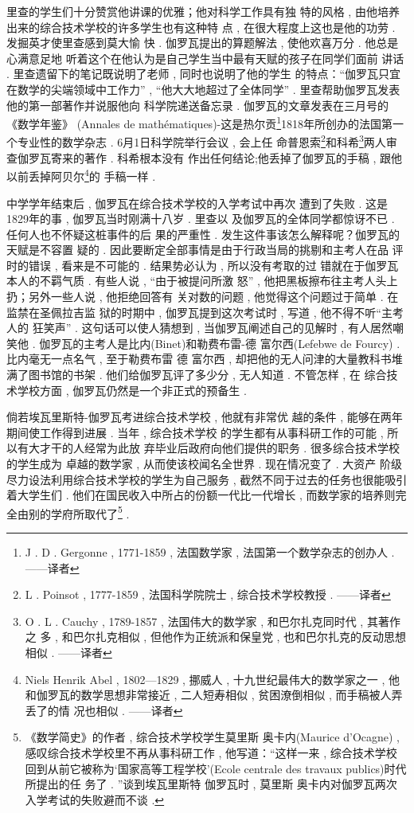 里查的学生们十分赞赏他讲课的优雅；他对科学工作具有独 特的风格 , 由他培养出来的综合技术学校的许多学生也有这种特 点 , 在很大程度上这也是他的功劳 . 发掘英才使里查感到莫大愉 快 . 伽罗瓦提出的算题解法 , 使他欢喜万分 . 他总是心满意足地 听着这个在他认为是自己学生当中最有天赋的孩子在同学们面前 讲话 . 里查遗留下的笔记既说明了老师 , 同时也说明了他的学生 的特点：“伽罗瓦只宜在数学的尖端领域中工作力” , “他大大地超过了全体同学” .  里查帮助伽罗瓦发表他的第一部著作并说服他向 科学院递送备忘录 . 伽罗瓦的文章发表在三月号的《数学年鉴》 (Annales de mathématiques)-这是热尔贡\footnote{J . D .  Gergonne ,  1771-1859 , 法国数学家 , 法国第一个数学杂志的创办人 .  ——译者}1818年所创办的法国第一个专业性的数学杂志 . 6月1日科学院举行会议 , 会上任 命普恩索\footnote{L . Poinsot , 1777-1859 , 法国科学院院士 , 综合技术学校教授 . ——译者}和科希\footnote{O . L . Cauchy , 1789-1857 , 法国伟大的数学家 , 和巴尔扎克同时代 , 其著作之 多 , 和巴尔扎克相似 , 但他作为正统派和保皇党 , 也和巴尔扎克的反动思想相似 .  ——译者}两人审查伽罗瓦寄来的著作 . 科希根本没有 作出任何结论;他丢掉了伽罗瓦的手稿 , 跟他以前丢掉阿贝尔\footnote{Niels Henrik Abel ,  1802—1829 , 挪威人 , 十九世纪最伟大的数学家之一 , 他 和伽罗瓦的数学思想非常接近 , 二人短寿相似 , 贫困潦倒相似 , 而手稿被人弄丢了的情 况也相似 . ——译者}的 手稿一样 . 

中学学年结束后 , 伽罗瓦在综合技术学校的入学考试中再次 遭到了失败 . 这是1829年的事 , 伽罗瓦当时刚满十八岁 . 里查以 及伽罗瓦的全体同学都惊讶不已 . 任何人也不怀疑这桩事件的后 果的严重性 . 发生这件事该怎么解释呢？伽罗瓦的天赋是不容置 疑的 . 因此要断定全部事情是由于行政当局的挑剔和主考人在品 评时的错误 , 看来是不可能的 . 结果势必认为 , 所以没有考取的过 错就在于伽罗瓦本人的不羁气质 . 有些人说 , “由于被提问所激 怒” , 他把黑板擦布往主考人头上扔；另外一些人说 , 他拒绝回答有 关对数的问题 , 他觉得这个问题过于简单 . 在监禁在圣佩拉吉监 狱的时期中 , 伽罗瓦提到这次考试时 , 写道 , 他不得不听“主考人的 狂笑声” . 这句话可以使人猜想到 , 当伽罗瓦阐述自己的见解时 , 有人居然嘲笑他 . 伽罗瓦的主考人是比内(Binet)和勒费布雷-德 \textbullet 富尔西(Lefebwe de Fourcy) . 比内毫无一点名气 , 至于勒费布雷 \textbullet 德 \textbullet 富尔西 , 却把他的无人问津的大量教科书堆满了图书馆的书架 . 他们给伽罗瓦评了多少分 , 无人知道 . 不管怎样 , 在 综合技术学校方面 , 伽罗瓦仍然是一个非正式的预备生 . 

倘若埃瓦里斯特-伽罗瓦考进综合技术学校 , 他就有非常优 越的条件 , 能够在两年期间使工作得到进展 . 当年 , 综合技术学校 的学生都有从事科研工作的可能 , 所以有大才干的人经常为此放 弃毕业后政府向他们提供的职务 . 很多综合技术学校的学生成为 卓越的数学家 , 从而使该校闻名全世界 . 现在情况变了 . 大资产 阶级尽力设法利用综合技术学校的学生为自己服务 , 截然不同于过去的任务也很能吸引着大学生们 . 他们在国民收入中所占的份额一代比一代增长 , 而数学家的培养则完全由别的学府所取代了\footnote{《数学简史》的作者 , 综合技术学校学生莫里斯 \textbullet 奥卡内(Maurice d'Ocagne) , 感叹综合技术学校里不再从事科研工作 , 他写道：“这样一来 , 综合技术学校回到从前它被称为‘国家高等工程学校’(Ecole centrale des travaux publics)时代所提出的任 务了 . ”谈到埃瓦里斯特 \textbullet 伽罗瓦时 , 莫里斯 \textbullet 奥卡内对伽罗瓦两次入学考试的失败避而不谈 . } . 

